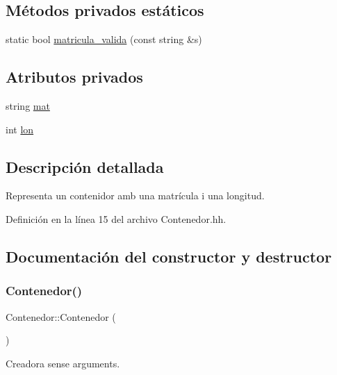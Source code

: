 \subsection*{Métodos privados estáticos}
\begin{DoxyCompactItemize}
\item 
static bool \hyperlink{class_contenedor_a5d718d3fba965652412913e5613dabe8}{matricula\+\_\+valida} (const string \&s)
\end{DoxyCompactItemize}
\subsection*{Atributos privados}
\begin{DoxyCompactItemize}
\item 
string \hyperlink{class_contenedor_a219718cff2c0f94314defbf8d747bfa9}{mat}
\item 
int \hyperlink{class_contenedor_a364e04e5a1c7787463981f192f48e4ce}{lon}
\end{DoxyCompactItemize}


\subsection{Descripción detallada}
Representa un contenidor amb una matrícula i una longitud. 

Definición en la línea 15 del archivo Contenedor.\+hh.



\subsection{Documentación del constructor y destructor}
\mbox{\label{class_contenedor_a1edc43fbcead41c4eba6530b7099cefd}} 
\subsubsection{\texorpdfstring{Contenedor()}{Contenedor()}\hspace{0.1cm}{\footnotesize\ttfamily [1/3]}}
{\footnotesize\ttfamily Contenedor\+::\+Contenedor (\begin{DoxyParamCaption}{ }\end{DoxyParamCaption})}



Creadora sense arguments. 


